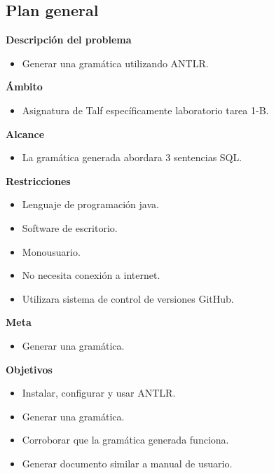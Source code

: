 \documentclass[a4paper,openright,14pt]{report}
\begin{document}
\subsection{Plan general}
\begin{flushleft}
\textbf{Descripci\'on del problema}
\end{flushleft}
\begin{itemize}
\item Generar una gram\'atica utilizando ANTLR.
\end{itemize}
\textbf{\'Ambito}
\begin{itemize}
\item Asignatura de Talf específicamente laboratorio tarea 1-B.
\end{itemize}
\textbf{Alcance}
\begin{itemize}
\item La gram\'atica generada abordara 3 sentencias SQL.
\end{itemize}
\textbf{Restricciones}
\begin{itemize}
\item Lenguaje de programaci\'on java.
\item Software de escritorio.
\item Monousuario.
\item No necesita conexi\'on a internet.
\item Utilizara sistema de control de versiones GitHub.
\end{itemize}
\textbf{Meta}
\begin{itemize}
\item Generar una gram\'atica.
\end{itemize}
\textbf{Objetivos}
\begin{itemize}
\item Instalar, configurar y usar ANTLR.
\item Generar una gram\'atica.
\item Corroborar que la gram\'atica generada funciona.
\item Generar documento similar a manual de usuario.	
\end{itemize}
\end{document}
